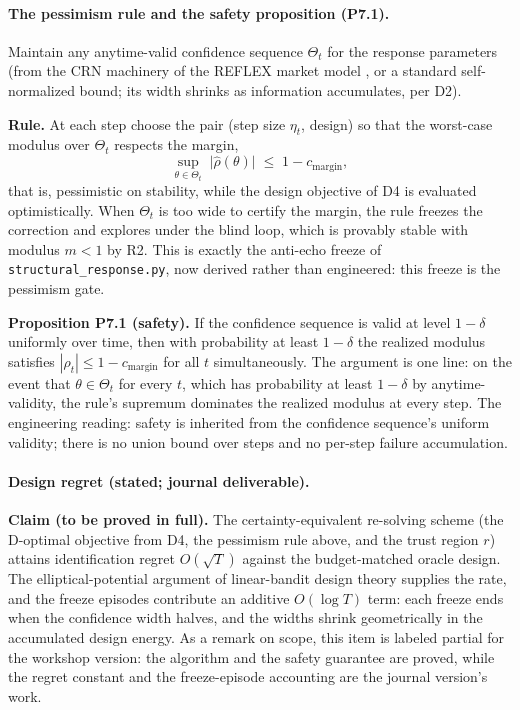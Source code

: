\paragraph{The pessimism rule and the safety proposition (P7.1).}
Maintain any anytime-valid confidence sequence $\Theta_t$ for the response
parameters (from the CRN machinery of the REFLEX market model \citep{reflex2026}, or a standard
self-normalized bound; its width shrinks as information accumulates, per
D2).

\textbf{Rule.} At each step choose the pair (step size $\eta_t$, design)
so that the worst-case modulus over $\Theta_t$ respects the margin,
\begin{equation*}
\sup_{\theta \in \Theta_t}\; \big|\hat\rho(\theta)\big|
\;\le\; 1 - c_{\mathrm{margin}} ,
\end{equation*}
that is, pessimistic on stability, while the design objective of D4 is
evaluated optimistically. When $\Theta_t$ is too wide to certify the
margin, the rule freezes the correction and explores under the blind loop,
which is provably stable with modulus $m<1$ by R2. This is exactly the
anti-echo freeze of \texttt{structural\_response.py}, now derived rather
than engineered: this freeze is the pessimism gate.

\textbf{Proposition P7.1 (safety).} If the confidence sequence is valid
at level $1-\delta$ uniformly over time, then with probability at least
$1-\delta$ the realized modulus satisfies
$|\rho_t| \le 1 - c_{\mathrm{margin}}$ for all $t$ simultaneously. The
argument is one line: on the event that $\theta \in \Theta_t$ for every
$t$, which has probability at least $1-\delta$ by anytime-validity, the
rule's supremum dominates the realized modulus at every step. The
engineering reading: safety is inherited from the confidence sequence's
uniform validity; there is no union bound over steps and no per-step
failure accumulation.

\paragraph{Design regret (stated; journal deliverable).}
\textbf{Claim (to be proved in full).} The certainty-equivalent
re-solving scheme (the D-optimal objective from D4, the pessimism rule
above, and the trust region $r$) attains identification regret
$O(\sqrt{T})$ against the budget-matched oracle design. The
elliptical-potential argument of linear-bandit design theory supplies the
rate, and the freeze episodes contribute an additive $O(\log T)$ term:
each freeze ends when the confidence width halves, and the widths shrink
geometrically in the accumulated design energy. As a remark on scope,
this item is labeled partial for the workshop version: the algorithm and
the safety guarantee are proved, while the regret constant and the
freeze-episode accounting are the journal version's work.

